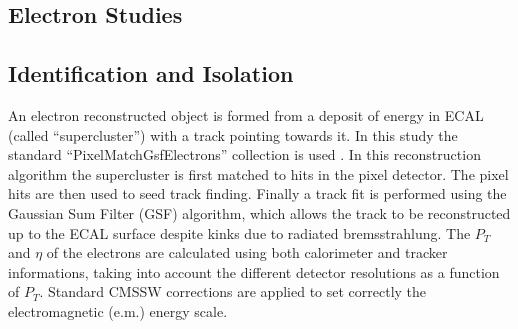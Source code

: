 \documentclass[colclass=cmspaper]{combine}
\begin{document}
\begin{linenumbers}



\section{Electron Studies} \label{sec:electrons}

\subsection{Identification and Isolation} \label{sec:IdAndIso}

An electron reconstructed object is formed from a deposit of energy in ECAL (called ``supercluster'') with a track pointing towards it.
In this study the standard ``PixelMatchGsfElectrons'' collection is used \cite{GSFele}.
In this reconstruction algorithm the supercluster is first matched to hits in the pixel detector.
The pixel hits are then used to seed track finding.  Finally a track fit is performed using the Gaussian Sum Filter 
(GSF) algorithm, which allows the track to be reconstructed up to the ECAL surface
despite kinks due to radiated bremsstrahlung.  
The $P_{T}$ and $\eta$ of the electrons are calculated using both calorimeter and tracker informations, 
taking into account the different detector resolutions as a function of $P_{T}$.
Standard CMSSW corrections are applied to set correctly the electromagnetic (e.m.) energy scale.


\end{linenumbers}
\end{document}
